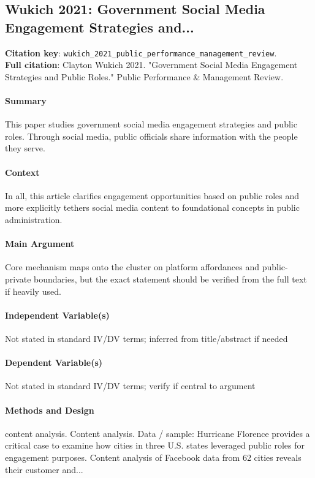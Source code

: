 \documentclass[12pt]{article}
\begin{document}
\subsection{Wukich 2021: Government Social Media Engagement Strategies and...}
\textbf{Citation key}: \texttt{wukich\_2021\_public\_performance\_management\_review}.\\
\textbf{Full citation}: Clayton Wukich 2021. "Government Social Media Engagement Strategies and Public Roles." Public Performance \& Management Review.

\paragraph{Summary} This paper studies government social media engagement strategies and public roles. Through social media, public officials share information with the people they serve.

\paragraph{Context} In all, this article clarifies engagement opportunities based on public roles and more explicitly tethers social media content to foundational concepts in public administration.

\paragraph{Main Argument} Core mechanism maps onto the cluster on platform affordances and public-private boundaries, but the exact statement should be verified from the full text if heavily used.

\paragraph{Independent Variable(s)} Not stated in standard IV/DV terms; inferred from title/abstract if needed

\paragraph{Dependent Variable(s)} Not stated in standard IV/DV terms; verify if central to argument

\paragraph{Methods and Design} content analysis. Content analysis. Data / sample: Hurricane Florence provides a critical case to examine how cities in three U.S. states leveraged public roles for engagement purposes. Content analysis of Facebook data from 62 cities reveals their customer and...
\end{document}
